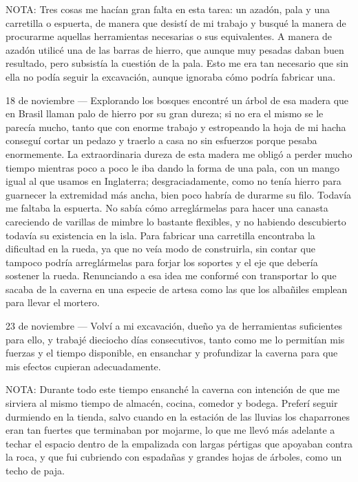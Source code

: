 \documentclass{novela}
\begin{document}
    NOTA: Tres cosas me hacían gran falta en esta tarea: un azadón, pala y una carretilla o espuerta, de manera que desistí de mi trabajo y busqué la manera de procurarme aquellas herramientas necesarias o sus equivalentes. A manera de azadón utilicé una de las barras de hierro, que aunque muy pesadas daban buen resultado, pero subsistía la cuestión de la pala. Esto me era tan necesario que sin ella no podía seguir la excavación, aunque ignoraba cómo podría fabricar una.


    18 de noviembre — Explorando los bosques encontré un árbol de esa madera que en Brasil llaman palo de hierro por su gran dureza; si no era el mismo se le parecía mucho, tanto que con enorme trabajo y estropeando la hoja de mi hacha conseguí cortar un pedazo y traerlo a casa no sin esfuerzos porque pesaba enormemente.
    La extraordinaria dureza de esta madera me obligó a perder mucho tiempo mientras poco a poco le iba dando la forma de una pala, con un mango igual al que usamos en Inglaterra; desgraciadamente, como no tenía hierro para guarnecer la extremidad más ancha, bien poco habría de durarme su filo.
    Todavía me faltaba la espuerta. No sabía cómo arreglármelas para hacer una canasta careciendo de varillas de mimbre lo bastante flexibles, y no habiendo descubierto todavía su existencia en la isla. Para fabricar una carretilla encontraba la dificultad en la rueda, ya que no veía modo de construirla, sin contar que tampoco podría arreglármelas para forjar los soportes y el eje que debería sostener la rueda. Renunciando a esa idea me conformé con transportar lo que sacaba de la caverna en una especie de artesa como las que los albañiles emplean para llevar el mortero.


    23 de noviembre — Volví a mi excavación, dueño ya de herramientas suficientes para ello, y trabajé dieciocho días consecutivos, tanto como me lo permitían mis fuerzas y el tiempo disponible, en ensanchar y profundizar la caverna para que mis efectos cupieran adecuadamente.


    NOTA: Durante todo este tiempo ensanché la caverna con intención de que me sirviera al mismo tiempo de almacén, cocina, comedor y bodega. Preferí seguir durmiendo en la tienda, salvo cuando en la estación de las lluvias los chaparrones eran tan fuertes que terminaban por mojarme, lo que me llevó más adelante a techar el espacio dentro de la empalizada con largas pértigas que apoyaban contra la roca, y que fui cubriendo con espadañas y grandes hojas de árboles, como un techo de paja.
\end{document}
